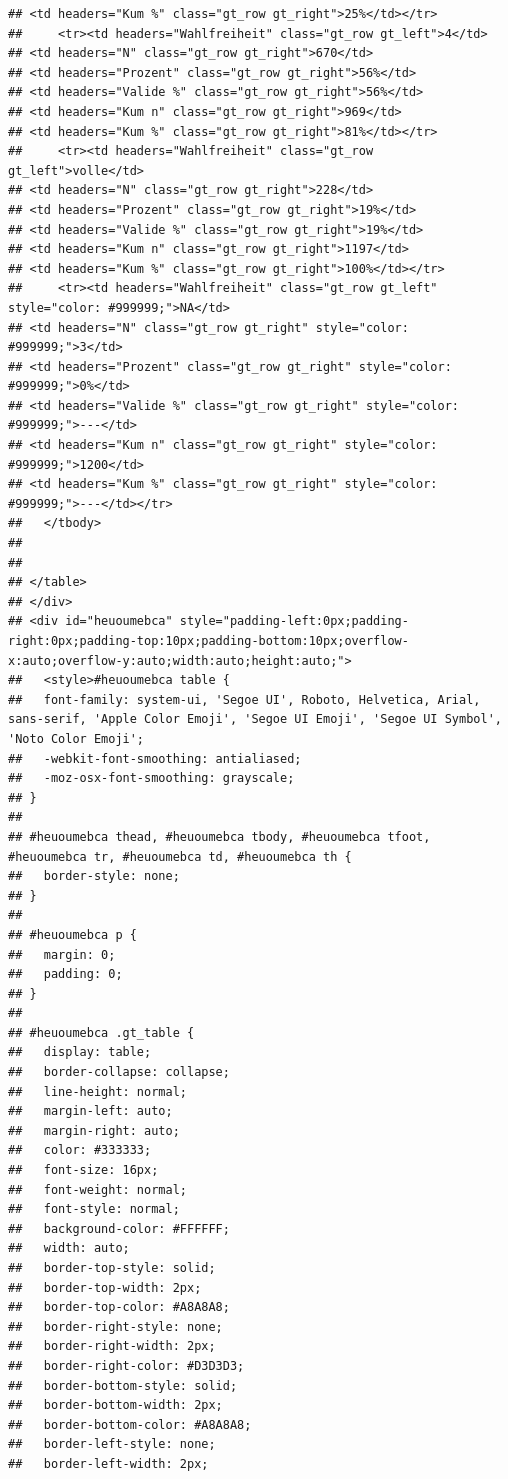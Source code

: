 \documentclass[
  a4paper,
  DIV=11,
  numbers=noendperiod]{scrartcl}
\begin{document}
\begin{verbatim}
## <td headers="Kum %" class="gt_row gt_right">25%</td></tr>
##     <tr><td headers="Wahlfreiheit" class="gt_row gt_left">4</td>
## <td headers="N" class="gt_row gt_right">670</td>
## <td headers="Prozent" class="gt_row gt_right">56%</td>
## <td headers="Valide %" class="gt_row gt_right">56%</td>
## <td headers="Kum n" class="gt_row gt_right">969</td>
## <td headers="Kum %" class="gt_row gt_right">81%</td></tr>
##     <tr><td headers="Wahlfreiheit" class="gt_row gt_left">volle</td>
## <td headers="N" class="gt_row gt_right">228</td>
## <td headers="Prozent" class="gt_row gt_right">19%</td>
## <td headers="Valide %" class="gt_row gt_right">19%</td>
## <td headers="Kum n" class="gt_row gt_right">1197</td>
## <td headers="Kum %" class="gt_row gt_right">100%</td></tr>
##     <tr><td headers="Wahlfreiheit" class="gt_row gt_left" style="color: #999999;">NA</td>
## <td headers="N" class="gt_row gt_right" style="color: #999999;">3</td>
## <td headers="Prozent" class="gt_row gt_right" style="color: #999999;">0%</td>
## <td headers="Valide %" class="gt_row gt_right" style="color: #999999;">---</td>
## <td headers="Kum n" class="gt_row gt_right" style="color: #999999;">1200</td>
## <td headers="Kum %" class="gt_row gt_right" style="color: #999999;">---</td></tr>
##   </tbody>
##   
##   
## </table>
## </div>
## <div id="heuoumebca" style="padding-left:0px;padding-right:0px;padding-top:10px;padding-bottom:10px;overflow-x:auto;overflow-y:auto;width:auto;height:auto;">
##   <style>#heuoumebca table {
##   font-family: system-ui, 'Segoe UI', Roboto, Helvetica, Arial, sans-serif, 'Apple Color Emoji', 'Segoe UI Emoji', 'Segoe UI Symbol', 'Noto Color Emoji';
##   -webkit-font-smoothing: antialiased;
##   -moz-osx-font-smoothing: grayscale;
## }
## 
## #heuoumebca thead, #heuoumebca tbody, #heuoumebca tfoot, #heuoumebca tr, #heuoumebca td, #heuoumebca th {
##   border-style: none;
## }
## 
## #heuoumebca p {
##   margin: 0;
##   padding: 0;
## }
## 
## #heuoumebca .gt_table {
##   display: table;
##   border-collapse: collapse;
##   line-height: normal;
##   margin-left: auto;
##   margin-right: auto;
##   color: #333333;
##   font-size: 16px;
##   font-weight: normal;
##   font-style: normal;
##   background-color: #FFFFFF;
##   width: auto;
##   border-top-style: solid;
##   border-top-width: 2px;
##   border-top-color: #A8A8A8;
##   border-right-style: none;
##   border-right-width: 2px;
##   border-right-color: #D3D3D3;
##   border-bottom-style: solid;
##   border-bottom-width: 2px;
##   border-bottom-color: #A8A8A8;
##   border-left-style: none;
##   border-left-width: 2px;

\end{verbatim}
\end{document}

